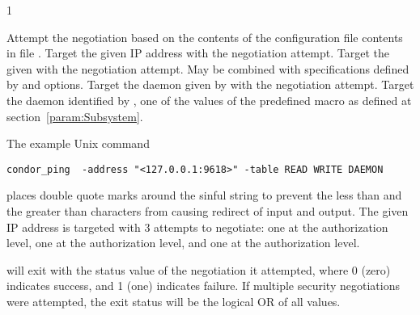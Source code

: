 \begin{ManPage}{\label{man-condor-ping}}{1}
\begin{Options}
  \ToolArgsBaseDesc
    {Attempt the negotiation based on the contents of the configuration file
    contents in file .  }
    {Target the given IP address with the negotiation attempt.  }
    {Target the given  with the negotiation attempt. 
    May be combined with specifications defined by  
    and  options. }
    {Target the daemon given by  with the negotiation attempt. 
    }
    {Target the daemon identified by , 
    one of the values of the predefined  macro
    as defined at section~\ref{param:Subsystem}.  }
\end{Options}

\Examples

The example Unix command
\begin{verbatim}
condor_ping  -address "<127.0.0.1:9618>" -table READ WRITE DAEMON
\end{verbatim}
places double quote marks around the sinful string to prevent the
less than and the greater than characters from causing redirect of
input and output.
The given IP address is targeted with 3 attempts to negotiate:
one at the  authorization level, 
one at the  authorization level, 
and one at the  authorization level.

\ExitStatus

 will exit with the status value of the negotiation
it attempted,
where 0 (zero) indicates success, and 1 (one) indicates failure.
If multiple security negotiations were attempted, 
the exit status will be the logical OR of all values.

\end{ManPage}
